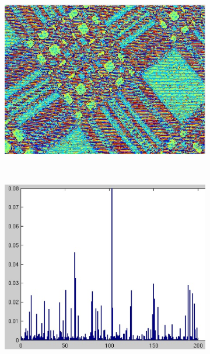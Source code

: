 \documentclass[10pt,twocolumn,letterpaper]{article}
\begin{document}
\begin{figure}
\begin{subfigure}[b]{0.2\textwidth}
        \includegraphics[width=\textwidth]{T25_D01.eps}
    \end{subfigure}
    ~ 
    \begin{subfigure}[b]{0.2\textwidth}
        \includegraphics[width=\textwidth]{T25_H01.eps}
    \end{subfigure}
    \\ 
    \begin{subfigure}[b]{0.2\textwidth}

\end{subfigure}
\end{figure}
\end{document}
